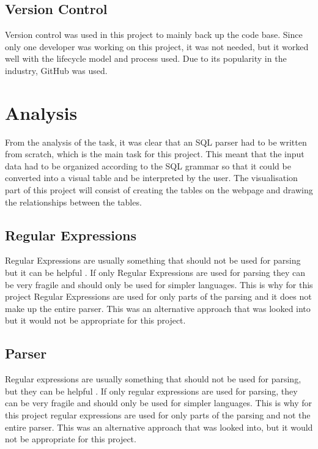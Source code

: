\subsection{Version Control}

Version control was used in this project to mainly back up the code base. Since only one developer was working on this project, it was not needed, but it worked well with the lifecycle model and process used. Due to its popularity in the industry, GitHub \cite{Github} was used.

\section{Analysis}

From the analysis of the task, it was clear that an SQL parser had to be written from scratch, which is the main task for this project. This meant that the input data had to be organized according to the SQL grammar so that it could be converted into a visual table and be interpreted by the user. The visualisation part of this project will consist of creating the tables on the webpage and drawing the relationships between the tables.

\subsection{Regular Expressions}

Regular Expressions are usually something that should not be used for parsing but it can be helpful \cite{Parsing}. If only Regular Expressions are used for parsing they can be very fragile and should only be used for simpler languages. This is why for this project Regular Expressions are used for only parts of the parsing and it does not make up the entire parser. This was an alternative approach that was looked into but it would not be appropriate for this project.

\subsection{Parser}

Regular expressions are usually something that should not be used for parsing, but they can be helpful \cite{Parsing}. If only regular expressions are used for parsing, they can be very fragile and should only be used for simpler languages. This is why for this project regular expressions are used for only parts of the parsing and not the entire parser. This was an alternative approach that was looked into, but it would not be appropriate for this project.

